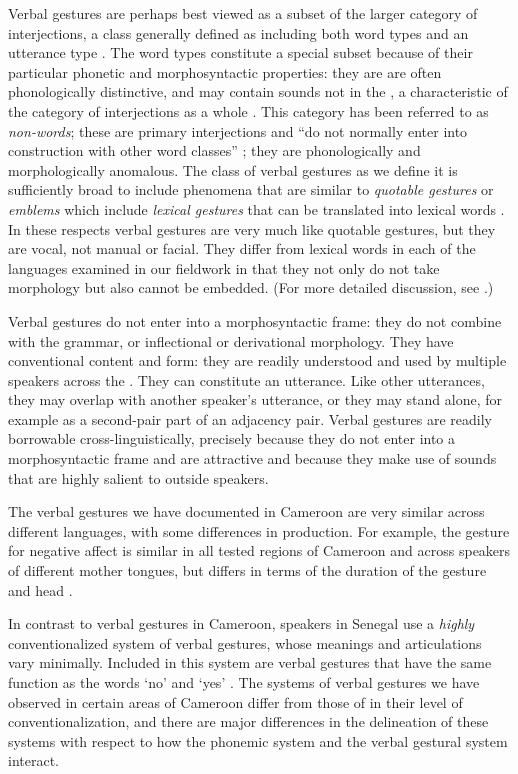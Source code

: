 \documentclass[output=paper
,newtxmath
,modfonts
,nonflat]{langsci/langscibook}
\begin{document}
Verbal gestures are perhaps best viewed as  a subset of the larger category of interjections, a class generally defined as including both word types and an utterance type \citep[102]{ameka1992}. The word types constitute a special subset because of their particular phonetic and morphosyntactic properties: they are are often phonologically distinctive, and may contain sounds not in the ,  a characteristic of the category of interjections as a whole  \citep{schachter1985}. This category has been referred to as \textit{non-words}; these are primary interjections and ``do not normally enter into construction with other word classes''  \citep[105]{ameka1992}; they are phonologically and morphologically anomalous. The class of verbal gestures as we define it is sufficiently broad to include  phenomena that  are similar to \textit{quotable gestures} or \textit{emblems}  which  include\textit{ lexical gestures} that can be translated into lexical words \citep{brookes2004, poggi1983, poggizomparelli1987}. In these respects verbal gestures are very much like quotable gestures, but they are vocal, not manual or facial. They differ from lexical words in each of the languages examined in our fieldwork in that they not only do not take morphology but also cannot be embedded. (For more detailed discussion, see \citealt{grenobleetal2015}.)  

Verbal gestures do not enter into a morphosyntactic frame: they do not combine with the grammar, or inflectional or derivational morphology. They have conventional content and form: they are  readily understood and used by multiple speakers across the . They  can constitute an utterance. Like other utterances, they may overlap with another speaker's utterance, or they may stand alone, for example as a second-pair part of an adjacency pair.
Verbal gestures are readily borrowable cross-linguistically, precisely because they do not enter into a morphosyntactic frame and are attractive and
because they make use of sounds that are highly salient to outside speakers. 

The  verbal gestures we have documented in Cameroon are very similar across different languages,  with some  differences in production.  For example, the gesture for negative affect is similar in all tested regions of Cameroon and across speakers of different mother tongues, but differs in terms of the duration of the gesture and head .  

In contrast to verbal gestures in Cameroon,   speakers in Senegal use a \textit{highly} conventionalized system of verbal gestures, whose meanings and articulations vary minimally. Included in this system are verbal gestures that have the same function as the words `no' and `yes' \citep{grenobleetal2015}.  The systems of verbal gestures we have observed in certain areas of Cameroon differ from those of  in their level of conventionalization, and there are major differences in the delineation of these systems with respect to how the phonemic system and the verbal gestural system interact. 
\end{document}
